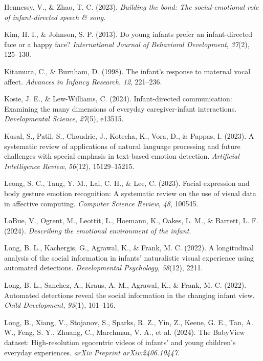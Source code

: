 \documentclass[10pt, letterpaper]{article}
\begin{document}
\begin{CSLReferences}{1}{0}
Hennessy, V., \& Zhao, T. C. (2023). \emph{Building the bond: The
social-emotional role of infant-directed speech \& song}.

Kim, H. I., \& Johnson, S. P. (2013). Do young infants prefer an
infant-directed face or a happy face? \emph{International Journal of
Behavioral Development}, \emph{37}(2), 125--130.

Kitamura, C., \& Burnham, D. (1998). The infant's response to maternal
vocal affect. \emph{Advances in Infancy Research}, \emph{12}, 221--236.

Kosie, J. E., \& Lew-Williams, C. (2024). Infant-directed communication:
Examining the many dimensions of everyday caregiver-infant interactions.
\emph{Developmental Science}, \emph{27}(5), e13515.

Kusal, S., Patil, S., Choudrie, J., Kotecha, K., Vora, D., \& Pappas, I.
(2023). A systematic review of applications of natural language
processing and future challenges with special emphasis in text-based
emotion detection. \emph{Artificial Intelligence Review}, \emph{56}(12),
15129--15215.

Leong, S. C., Tang, Y. M., Lai, C. H., \& Lee, C. (2023). Facial
expression and body gesture emotion recognition: A systematic review on
the use of visual data in affective computing. \emph{Computer Science
Review}, \emph{48}, 100545.

LoBue, V., Ogrent, M., Leottit, L., Hoemann, K., Oakes, L. M., \&
Barrett, L. F. (2024). \emph{Describing the emotional environment of the
infant}.

Long, B. L., Kachergis, G., Agrawal, K., \& Frank, M. C. (2022). A
longitudinal analysis of the social information in infants' naturalistic
visual experience using automated detections. \emph{Developmental
Psychology}, \emph{58}(12), 2211.

Long, B. L., Sanchez, A., Kraus, A. M., Agrawal, K., \& Frank, M. C.
(2022). Automated detections reveal the social information in the
changing infant view. \emph{Child Development}, \emph{93}(1), 101--116.

Long, B., Xiang, V., Stojanov, S., Sparks, R. Z., Yin, Z., Keene, G. E.,
Tan, A. W., Feng, S. Y., Zhuang, C., Marchman, V. A., et al. (2024). The
BabyView dataset: High-resolution egocentric videos of infants' and
young children's everyday experiences. \emph{arXiv Preprint
arXiv:2406.10447}.


\end{CSLReferences}
\end{document}
